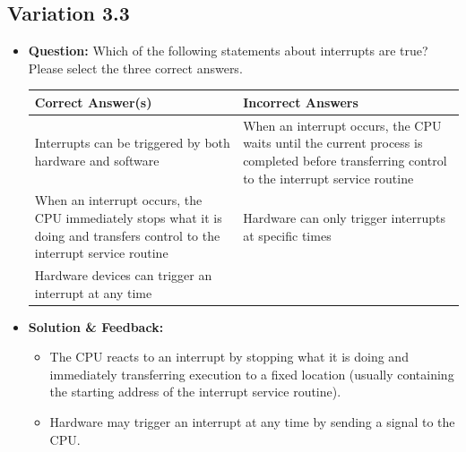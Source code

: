 \subsection{Variation 3.3}
\begin{itemize}
    \item \textbf{Question:} Which of the following statements about interrupts are true? Please select the three correct answers.
    
    \begin{tabularx}{\textwidth}{|X|X|}
        \hline
        \textbf{Correct Answer(s)} & \textbf{Incorrect Answers} \\
        \hline
        Interrupts can be triggered by both hardware and software & When an interrupt occurs, the CPU waits until the current process is completed before transferring control to the interrupt service routine \\
        When an interrupt occurs, the CPU immediately stops what it is doing and transfers control to the interrupt service routine & Hardware can only trigger interrupts at specific times \\
        Hardware devices can trigger an interrupt at any time & \\
        \hline
    \end{tabularx}
    
    \item \textbf{Solution \& Feedback:}
    \begin{itemize}
        \item The CPU reacts to an interrupt by stopping what it is doing and immediately transferring execution to a fixed location (usually containing the starting address of the interrupt service routine).
        \item Hardware may trigger an interrupt at any time by sending a signal to the CPU.
    \end{itemize}
\end{itemize}

